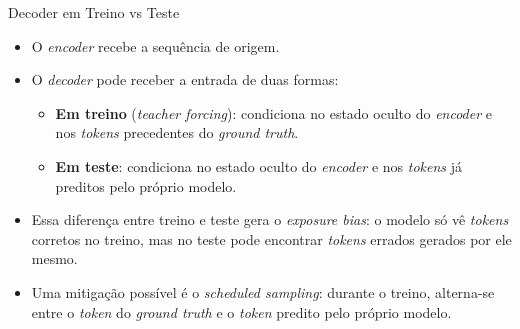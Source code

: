 \documentclass[aspectratio=169,xcolor=dvipsnames]{beamer}
\begin{document}
\begin{frame}{Decoder em Treino vs Teste}
\begin{itemize}
    \item O \textit{encoder} recebe a sequência de origem.
    \item O \textit{decoder} pode receber a entrada de duas formas:
    \begin{itemize}
        \item \textbf{Em treino} (\textit{teacher forcing}): condiciona no estado oculto do \textit{encoder} e nos \textit{tokens} precedentes do \textit{ground truth}.
        \item \textbf{Em teste}: condiciona no estado oculto do \textit{encoder} e nos \textit{tokens} já preditos pelo próprio modelo.
    \end{itemize}
    \item Essa diferença entre treino e teste gera o \textit{exposure bias}: o modelo só vê \textit{tokens} corretos no treino, mas no teste pode encontrar \textit{tokens} errados gerados por ele mesmo.
    \item Uma mitigação possível é o \textit{scheduled sampling}: durante o treino, alterna-se entre o \textit{token} do \textit{ground truth} e o \textit{token} predito pelo próprio modelo.
\end{itemize}
\end{frame}
\end{document}
